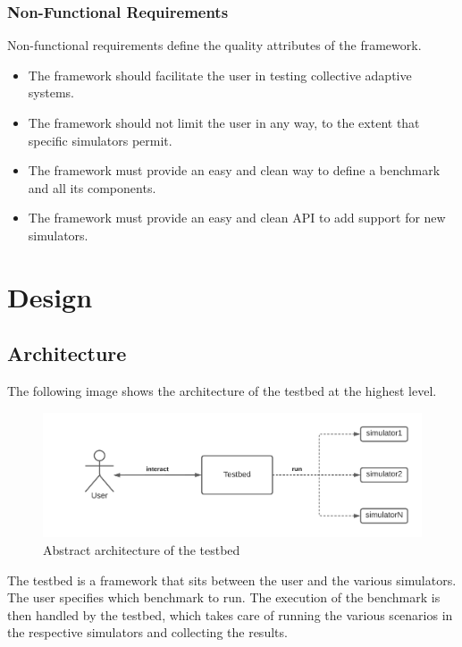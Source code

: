 \documentclass[12pt,a4paper,openright,twoside]{book}
\begin{document}
\subsection*{Non-Functional Requirements}
Non-functional requirements define the quality attributes of the framework.

\begin{itemize}
  \item The framework should facilitate the user in testing collective adaptive systems.
  \item The framework should not limit the user in any way, to the extent that specific simulators permit.
  \item The framework must provide an easy and clean way to define a benchmark and all its components.
  \item The framework must provide an easy and clean API to add support for new simulators.
\end{itemize}

\chapter{Design}

\section{Architecture}

The following image shows the architecture of the testbed at the highest level.

\begin{figure}[h]
  \centering
  \includegraphics[width=\textwidth]{figures/architecture-high-level.png}
  \caption{Abstract architecture of the testbed}
\end{figure}

The testbed is a framework that sits between the user and the various simulators.
The user specifies which benchmark to run.
The execution of the benchmark is then handled by the testbed, which takes care of running the various scenarios in the respective simulators and collecting the results.
\end{document}
